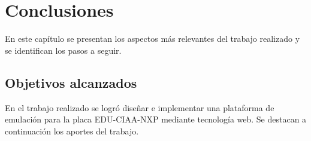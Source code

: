 
\chapter{Conclusiones} %

\label{Chapter5} %

En este capítulo se presentan los aspectos más relevantes del trabajo realizado y
se identifican los pasos a seguir.


\section{Objetivos alcanzados}

En el trabajo realizado se logró diseñar e implementar una plataforma de emulación para la placa EDU-CIAA-NXP mediante tecnología web. Se destacan a continuación los aportes del
trabajo.

